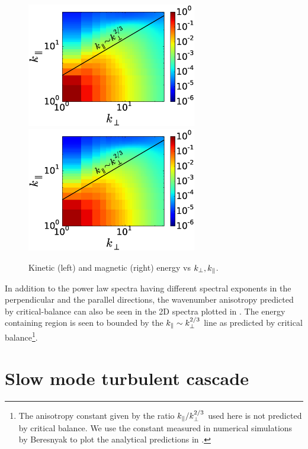 \begin{figure}
\begin{center}
    \includegraphics[width=7.4cm]{figs/slowmodes/sw1_u2_kparkp.eps}
    \includegraphics[width=7.4cm]{figs/slowmodes/sw1_b2_kparkp.eps}
    \caption{Kinetic (left) and magnetic (right) energy  vs $k_\perp, k_\parallel$.}
\label{slowmodes:fig:alfanis} 
\end{center}
\end{figure}

    In addition to the power law spectra having different spectral exponents in the
    perpendicular and the parallel directions, the wavenumber anisotropy predicted by
    critical-balance can also be seen in the 2D spectra plotted in
    . The energy containing region is seen
    to bounded by the $k_\parallel \sim k_\perp^{2/3}$ line as predicted by critical
    balance\footnote{The anisotropy constant given by the ratio $k_\parallel/k_\perp^{2/3}$ used
    here is not predicted by critical balance. We use the constant measured in numerical
    simulations by Beresnyak \cite{beresnyak11} to plot the analytical predictions in
    .}.

\section{Slow mode turbulent cascade}


